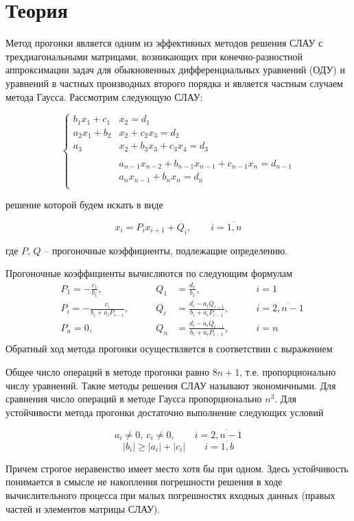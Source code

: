 \section*{Теория}

Метод прогонки является одним из эффективных методов
решения СЛАУ с трехдиагональными
матрицами, возникающих при конечно-разностной аппроксимации
задач для обыкновенных
дифференциальных уравнений (ОДУ) и уравнений в частных
производных второго порядка и
является частным случаем метода Гаусса. Рассмотрим
следующую СЛАУ:

$$\left\{\begin{aligned}
    b_1x_1 + c_1&x_2 = d_1 \\
    a_2x_1 + b_2&x_2 + c_2x_3 = d_2 \\
    a_3&x_2 + b_3x_3 + c_3x_4 = d_3 \\
    \\
    & a_{n-1}x_{n-2} + b_{n-1}x_{n-1} + c_{n-1}x_{n} = d_{n-1} \\
    & a_{n}x_{n-1} + b_{n}x_{n} = d_{n} \\
\end{aligned}\right.$$

решение которой будем искать в виде

$$x_i = P_ix_{i+1} + Q_i, \qquad i=\overline{1,n}$$

где $P$, $Q$ – прогоночные коэффициенты,
подлежащие определению.

Прогоночные коэффициенты вычисляются по следующим формулам
$$\begin{alignedat}{6}
    &P_1 = -\frac{c_1}{b_1}, &Q_1 &= \frac{d_1}{b_1}, &i = 1\\
    &P_i = -\frac{c_i}{b_i + a_iP_{i-1}},
        \qquad &Q_i &= \frac{d_i - a_iQ_{i-1}}{b_i + a_iP_{i-1}},
        \qquad &i=\overline{2,n-1} \\
    &P_n = 0, &Q_n &= \frac{d_i - a_iQ_{i-1}}{b_i + a_iP_{i-1}},
        &i=n\\
\end{alignedat}$$
Обратный ход метода прогонки осуществляется в соответствии с выражением

Общее число операций в методе прогонки равно
$8n+1$, т.е. пропорционально числу уравнений. Такие методы
решения СЛАУ называют экономичными. Для сравнения число
операций в методе Гаусса пропорционально $n^3$.
Для устойчивости метода прогонки достаточно
выполнение следующих условий

$$a_i \neq 0,\ c_i \neq 0, \qquad i = \overline{2,n-1}$$
$$|b_i| \geqslant |a_i| + |c_i| \qquad i = \overline{1,b}$$

Причем строгое неравенство имеет место хотя бы при одном.
Здесь устойчивость понимается в
смысле не накопления погрешности решения в ходе
вычислительного процесса при малых
погрешностях входных данных (правых частей и элементов
матрицы СЛАУ).
\pagebreak